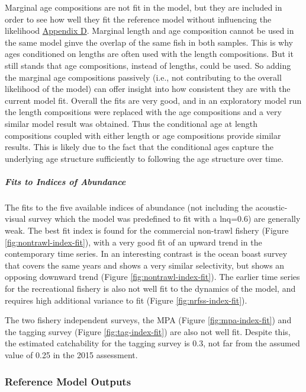 \documentclass[11pt,
  english,
  letterpaper,
]{article}
\begin{document}
Marginal age compositions are not fit in the model, but they are included in order to see how well they fit the reference model without influencing the likelihood \protect\hyperlink{app_d}{Appendix D}. Marginal length and age composition cannot be used in the same model ginve the overlap of the same fish in both samples. This is why ages conditioned on lengths are often used with the length compositions. But it still stands that age compositions, instead of lengths, could be used. So adding the marginal age compositions passively (i.e., not contributing to the overall likelihood of the model) can offer insight into how consistent they are with the current model fit. Overall the fits are very good, and in an exploratory model run the length compositions were replaced with the age compositions and a very similar model result was obtained. Thus the conditional age at length compositions coupled with either length or age compositions provide similar results. This is likely due to the fact that the conditional ages capture the underlying age structure sufficiently to following the age structure over time.

\hypertarget{fits-to-indices-of-abundance}{%
\subparagraph{Fits to Indices of Abundance}\label{fits-to-indices-of-abundance}}

The fits to the five available indices of abundance (not including the acoustic-visual survey which the model was predefined to fit with a lnq=0.6) are generally weak. The best fit index is found for the commercial non-trawl fishery (Figure \ref{fig:nontrawl-index-fit}), with a very good fit of an upward trend in the contemporary time series. In an interesting contrast is the ocean boast survey that covers the same years and shows a very similar selectivity, but shows an opposing downward trend (Figure \ref{fig:nontrawl-index-fit}). The earlier time series for the recreational fishery is also not well fit to the dynamics of the model, and requires high additional variance to fit (Figure \ref{fig:nrfss-index-fit}).

The two fishery independent surveys, the MPA (Figure \ref{fig:mpa-index-fit}) and the tagging survey (Figure \ref{fig:tag-index-fit}) are also not well fit. Despite this, the estimated catchability for the tagging survey is 0.3, not far from the assumed value of 0.25 in the 2015 assessment.

\hypertarget{reference-model-outputs}{%
\subsubsection{Reference Model Outputs}\label{reference-model-outputs}}
\end{document}

